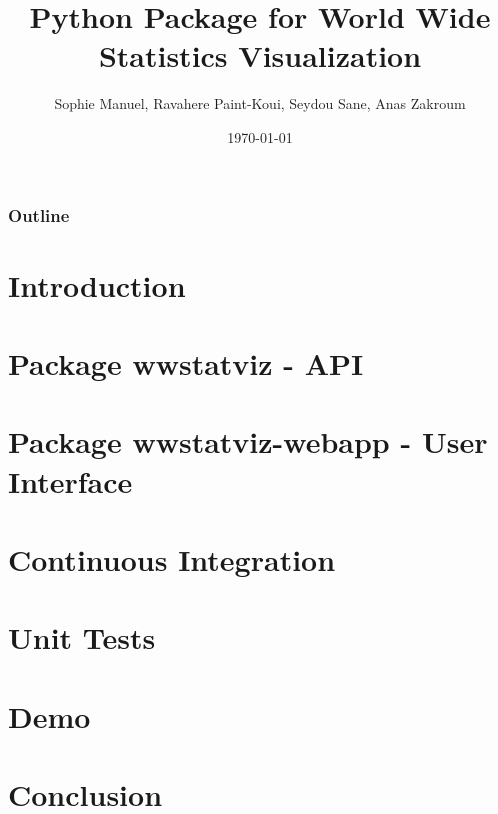 \documentclass{beamer}
\title{Python Package for World Wide Statistics Visualization}
\subtitle{}
\author{\footnotesize{Sophie Manuel, Ravahere Paint-Koui, Seydou Sane, Anas Zakroum}}
\date{\today}
\institute{Université de Montpellier}
\begin{document}
\begin{frame}[plain]
  \titlepage
\end{frame}

\small
\begin{frame}[plain]
  \frametitle{Outline}
  \tableofcontents
\end{frame}
\normalsize

\section{Introduction}


\section{Package wwstatviz - API}


\section{Package wwstatviz-webapp - User Interface}

\section{Continuous Integration}

\section{Unit Tests}


\section{Demo}


\section{Conclusion}

\end{document}
